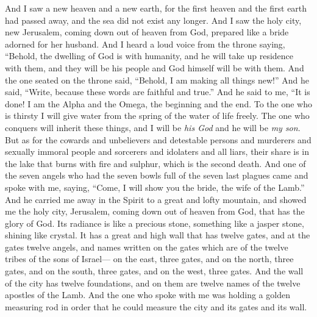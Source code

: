 \begin{biblechapter} %
 And I saw a new heaven and a new earth, for the first heaven and the first earth had passed away, and the sea did not exist any longer.
\verse And I saw the holy city, new Jerusalem, coming down out of heaven from God, prepared like a bride adorned for her husband.
\verse And I heard a loud voice from the throne saying,
\verse “Behold, the dwelling of God is with humanity, 
and he will take up residence with them, 
and they will be his people 
and God himself will be with them.
\verse And the one seated on the throne said, “Behold, I am making all things new!” And he said, “Write, because these words are faithful and true.”
\verse And he said to me, “It is done! I am the Alpha and the Omega, the beginning and the end. To the one who is thirsty I will give water from the spring of the water of life freely.
\verse The one who conquers will inherit these things, and I will be \textit{his God} and he will be \textit{my son}.
\verse But as for the cowards and unbelievers and detestable persons and murderers and sexually immoral people and sorcerers and idolaters and all liars, their share is in the lake that burns with fire and sulphur, which is the second death.
 And one of the seven angels who had the seven bowls full of the seven last plagues came and spoke with me, saying, “Come, I will show you the bride, the wife of the Lamb.”
\verse And he carried me away in the Spirit to a great and lofty mountain, and showed me the holy city, Jerusalem, coming down out of heaven from God,
\verse that has the glory of God. Its radiance is like a precious stone, something like a jasper stone, shining like crystal.
\verse It has a great and high wall that has twelve gates, and at the gates twelve angels, and names written on the gates which are of the twelve tribes of the sons of Israel—
\verse on the east, three gates, and on the north, three gates, and on the south, three gates, and on the west, three gates.
\verse And the wall of the city has twelve foundations, and on them are twelve names of the twelve apostles of the Lamb.
\verse And the one who spoke with me was holding a golden measuring rod in order that he could measure the city and its gates and its wall.

\end{biblechapter}

